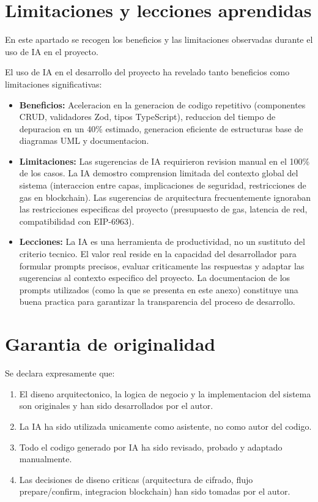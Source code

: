 \documentclass[11pt, a4paper]{article}
\begin{document}
\section{Limitaciones y lecciones aprendidas}

En este apartado se recogen los beneficios y las limitaciones observadas durante el uso de IA en el proyecto.

El uso de IA en el desarrollo del proyecto ha revelado tanto beneficios como limitaciones significativas:

\begin{itemize}
    \item \textbf{Beneficios:} Aceleracion en la generacion de codigo repetitivo (componentes CRUD, validadores Zod, tipos TypeScript), reduccion del tiempo de depuracion en un 40\% estimado, generacion eficiente de estructuras base de diagramas UML y documentacion.
    \item \textbf{Limitaciones:} Las sugerencias de IA requirieron revision manual en el 100\% de los casos. La IA demostro comprension limitada del contexto global del sistema (interaccion entre capas, implicaciones de seguridad, restricciones de gas en blockchain). Las sugerencias de arquitectura frecuentemente ignoraban las restricciones especificas del proyecto (presupuesto de gas, latencia de red, compatibilidad con EIP-6963).
    \item \textbf{Lecciones:} La IA es una herramienta de productividad, no un sustituto del criterio tecnico. El valor real reside en la capacidad del desarrollador para formular prompts precisos, evaluar criticamente las respuestas y adaptar las sugerencias al contexto especifico del proyecto. La documentacion de los prompts utilizados (como la que se presenta en este anexo) constituye una buena practica para garantizar la transparencia del proceso de desarrollo.
\end{itemize}

\section{Garantia de originalidad}

Se declara expresamente que:

\begin{enumerate}
    \item El diseno arquitectonico, la logica de negocio y la implementacion del sistema son originales y han sido desarrollados por el autor.
    \item La IA ha sido utilizada unicamente como asistente, no como autor del codigo.
    \item Todo el codigo generado por IA ha sido revisado, probado y adaptado manualmente.
    \item Las decisiones de diseno criticas (arquitectura de cifrado, flujo prepare/confirm, integracion blockchain) han sido tomadas por el autor.
\end{enumerate}
\end{document}
